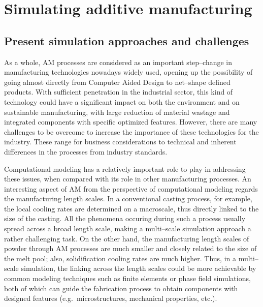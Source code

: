 \chapter{Simulating additive manufacturing}

\section{Present simulation approaches and challenges\label{sec:challenges}}

As a whole, AM processes are considered as an important step--change in manufacturing technologies nowadays widely used, opening up the possibility of going almost directly from Computer Aided Design to net--shape defined products. With sufficient penetration in the industrial sector, this kind of technology could have a significant impact on both the environment and on sustainable manufacturing, with large reduction of material wastage and integrated components with specific optimized features.
However, there are many challenges to be overcome to increase the importance of these technologies for the industry. These range for business considerations to technical and inherent differences in the processes from industry standards.

Computational modeling has a relatively important role to play in addressing these issues, when compared with its role in other manufacturing processes. An interesting aspect of AM from the perspective of computational modeling regards the manufacturing length scales. In a conventional casting process, for example, the local cooling rates are determined on a macroscale, thus directly linked to the size of the casting. All the phenomena occuring during such a process usually spread across a broad length scale, making a multi--scale simulation approach a rather challenging task.
On the other hand, the manufacturing length scales of powder through AM processes are much smaller and closely related to the size of the melt pool; also, solidification cooling rates are much higher. Thus, in a multi--scale simulation, the linking across the length scales could be more achievable by common modeling techniques such as finite elements or phase field simulations, both of which can guide the fabrication process to obtain components with designed features (e.g.\ microstructures, mechanical properties, etc.).

